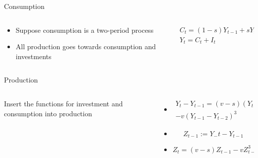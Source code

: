 \documentclass{beamer}
\begin{document}
\begin{frame}{Consumption}
	\begin{columns}
		\begin{column}{0.5\textwidth}
			\begin{itemize}
				\item
					Suppose consumption is a two-period process
				\item
					All production goes towards consumption and investments
			\end{itemize}
		\end{column}

		\begin{column}{0.5\textwidth}
			\begin{gather*}
				C_t=(1-s)Y_{t-1}+sY_{t-2}\\
				Y_t=C_t+I_t
			\end{gather*}
		\end{column}
	\end{columns}
\end{frame}

\begin{frame}{Production}
	\begin{columns}
		\begin{column}{0.3\textwidth}
			Insert the functions for investment and consumption into production
		\end{column}
		\begin{column}{0.7\textwidth}
			\begin{itemize}
				\item
					\begin{equation*}
						\begin{split}
						Y_t-Y_{t-1}=(v-s)(Y_{t-1}-Y_{t-2})\\
						-v(Y_{t-1}-Y_{t-2})^3
					\end{split}
					\end{equation*}

				\item
					\begin{equation*}
						Z_{t-1}:=Y_-t-Y_{t-1}
					\end{equation*}

				\item
					\begin{equation*}
						Z_t=(v-s)Z_{t-1}-vZ^3_{t-1}
					\end{equation*}
			\end{itemize}
		\end{column}
	\end{columns}
\end{frame}
\end{document}
